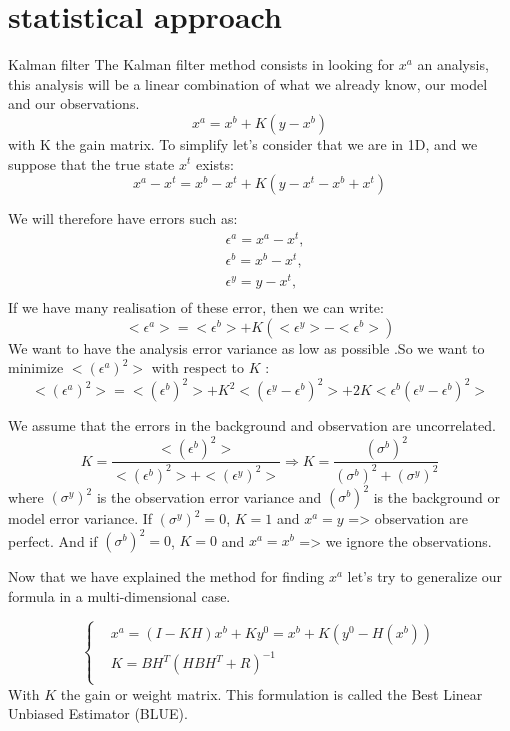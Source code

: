 \documentclass[10pt,xcolor={table,dvipsnames},t]{beamer}
\begin{document}
\section{statistical approach}
    \begin{frame}{Kalman filter}
        The Kalman filter method consists in looking for $x^a$ an analysis, this analysis will be a linear combination of what we already know, our model and our observations.
        $$x^a=x^b+K(y-x^b)$$
        with K the gain matrix.
        To simplify let’s consider that we are in 1D, and we suppose that the true state $x^t$ exists:
        $$x^a-x^t=x^b-x^t+K(y-x^t-x^b+x^t)$$
    \end{frame}   
    \begin{frame}
        We will therefore have errors such as:
        $$\begin{aligned}
            &\epsilon^a=x^a-x^t, \\
            &\epsilon^b=x^b-x^t, \\
            &\epsilon^y=y-x^t, \\
        \end{aligned}$$
        If we have many realisation of these error, then we can write:
        $$<\epsilon^a>=<\epsilon^b>+K(<\epsilon^y>-<\epsilon^b>)$$
        We want to have the analysis error variance as low as possible .So we want to minimize $<(\epsilon^a)^2>$ with respect to $K$ :
        $$<(\epsilon^a)^2>=<(\epsilon^b)^2>+K^2<(\epsilon^y-\epsilon^b)^2>+2K<\epsilon^b(\epsilon^y-\epsilon^b)^2>$$
    \end{frame}
    \begin{frame}
        We assume that the errors in the background and observation are uncorrelated.
        $$K=\frac{<(\epsilon^b)^2>}{<(\epsilon^b)^2>+<(\epsilon^y)^2>} \Rightarrow K=\frac{(\sigma^b)^2}{(\sigma^b)^2+(\sigma^y)^2} $$
        where $(\sigma^y)^2$ is the observation error variance and $(\sigma^b)^2$ is the background or model error variance.
        \newline If  $(\sigma^y)^2=0$, $K=1$ and $x^a=y$ => observation are perfect.
        \newline And if $(\sigma^b)^2=0$, $K=0$ and $x^a=x^b$ => we ignore the observations.
    \end{frame}
    \begin{frame}
        Now that we have explained the method for finding $x^a$ let's try to generalize our formula in a multi-dimensional case.

        $$\left\{\begin{aligned}
		    &x^a=(I-KH)x^b+Ky^0=x^b+K(y^0-H(x^b)) \\
            &K=BH^T(HBH^T+R)^{-1} \\
	    \end{aligned}\right.$$
        With $K$ the gain or weight matrix.
        This formulation is called the Best Linear Unbiased Estimator (BLUE).
    \end{frame}
    \begin{frame}
    \end{frame}
\end{document}
